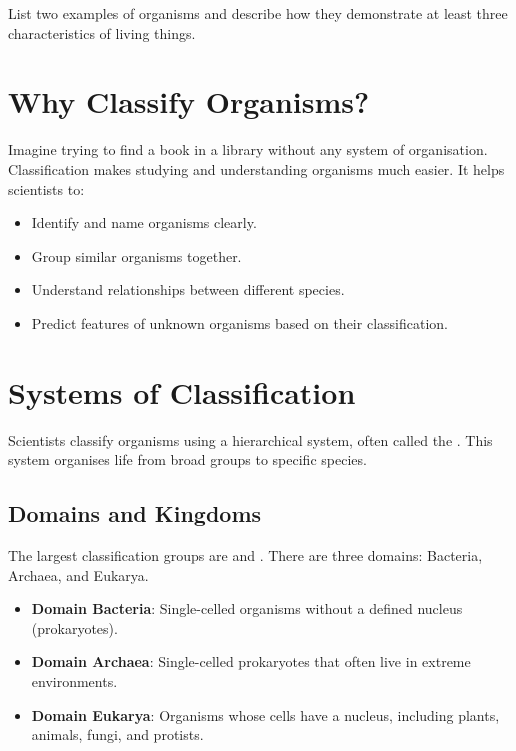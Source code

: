 
\begin{stopandthink}
List two examples of organisms and describe how they demonstrate at least three characteristics of living things.
\end{stopandthink}

\section{Why Classify Organisms?}

Imagine trying to find a book in a library without any system of organisation. Classification makes studying and understanding organisms much easier. It helps scientists to:

\begin{itemize}
    \item Identify and name organisms clearly.
    \item Group similar organisms together.
    \item Understand relationships between different species.
    \item Predict features of unknown organisms based on their classification.
\end{itemize}

\section{Systems of Classification}

Scientists classify organisms using a hierarchical system, often called the . This system organises life from broad groups to specific species.

\subsection{Domains and Kingdoms}

The largest classification groups are  and . There are three domains: Bacteria, Archaea, and Eukarya.

\begin{itemize}
    \item \textbf{Domain Bacteria}: Single-celled organisms without a defined nucleus (prokaryotes).
    \item \textbf{Domain Archaea}: Single-celled prokaryotes that often live in extreme environments.
    \item \textbf{Domain Eukarya}: Organisms whose cells have a nucleus, including plants, animals, fungi, and protists.
\end{itemize}

